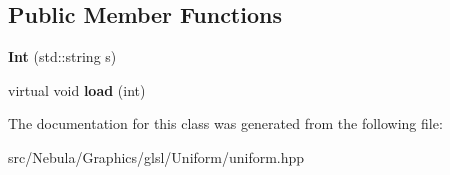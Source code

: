 \subsection*{\-Public \-Member \-Functions}
\begin{DoxyCompactItemize}
\item 
\hypertarget{classNeb_1_1glsl_1_1Uniform_1_1Scalar_1_1Int_afc2e77242ed6bbb588978085f515a7bf}{{\bfseries \-Int} (std\-::string s)}\label{classNeb_1_1glsl_1_1Uniform_1_1Scalar_1_1Int_afc2e77242ed6bbb588978085f515a7bf}

\item 
\hypertarget{classNeb_1_1glsl_1_1Uniform_1_1Scalar_1_1Int_a354cb0c548d41c8dc6f111c9355cf6eb}{virtual void {\bfseries load} (int)}\label{classNeb_1_1glsl_1_1Uniform_1_1Scalar_1_1Int_a354cb0c548d41c8dc6f111c9355cf6eb}

\end{DoxyCompactItemize}


\-The documentation for this class was generated from the following file\-:\begin{DoxyCompactItemize}
\item 
src/\-Nebula/\-Graphics/glsl/\-Uniform/uniform.\-hpp\end{DoxyCompactItemize}
